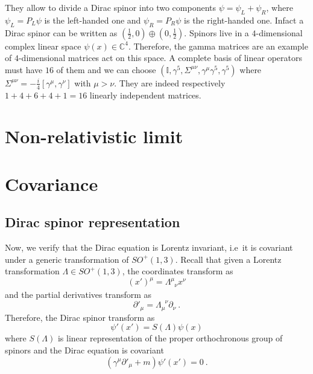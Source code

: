     They allow to divide a Dirac spinor into two components $\psi = \psi_L + \psi_R$, where $\psi_L = P_L \psi$ is the left-handed one and $\psi_R = P_R \psi$ is the right-handed one. Infact a Dirac spinor can be written as $(\frac{1}{2}, 0) \oplus (0, \frac{1}{2})$. Spinors live in a $4$-dimensional complex linear space $\psi(x) \in \mathbb C^4$. Therefore, the gamma matrices are an example of $4$-dimensional matrices act on this space. A complete basis of linear operators must have $16$ of them and we can choose $(\mathbb I, \gamma^5, \Sigma^{\mu\nu}, \gamma^\mu \gamma^5, \gamma^5)$ where $\Sigma^{\mu\nu} = - \frac{i}{4} [\gamma^\mu, \gamma^\nu]$ with $\mu > \nu$. They are indeed respectively $1 + 4 + 6 + 4 + 1 = 16$ linearly independent matrices. 

\chapter{Non-relativistic limit} 

\chapter{Covariance} 

\section{Dirac spinor representation}

    Now, we verify that the Dirac equation is Lorentz invariant, i.e~it is covariant under a generic transformation of $SO^+(1,3)$. Recall that given a Lorentz transformation $\Lambda \in SO^+(1,3)$, the coordinates transform as 
    \begin{equation*}
        (x')^\mu = \Lambda^\mu_{\phantom \mu \nu} x^\nu
    \end{equation*}
    and the partial derivatives transform as 
    \begin{equation*}
        {\partial'}_\mu = \Lambda_\mu^{\phantom \mu \nu} \partial_\nu ~.
    \end{equation*}
    Therefore, the Dirac spinor transform as 
    \begin{equation*}
        \psi'(x') = S(\Lambda) \psi(x)
    \end{equation*}
    where $S(\Lambda)$ is linear representation of the proper orthochronous group of spinors and the Dirac equation is covariant 
    \begin{equation*}
        (\gamma^\mu \partial'_\mu + m) \psi' (x') = 0 ~.
    \end{equation*}


